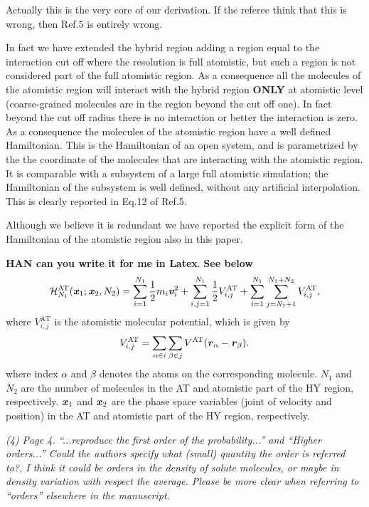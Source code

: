 \documentclass[12pt]{article}
\newcommand{\recheck}[1]{{\color{red} #1}}
\newcommand{\vect}[1]{\textbf{\textit{#1}}}
\newcommand{\AT}{{\textrm{{AT}}}}
\begin{document}
Actually this is the very core of our derivation. If the referee think
that this is wrong, then Ref.5 is entirely wrong.

In fact we have extended the hybrid region adding a region equal to
the interaction cut off where the resolution is full atomistic, but
such a region is not considered part of the full atomistic region. As
a consequence all the molecules of the atomistic region will interact
with the hybrid region {\bf ONLY} at atomistic level (coarse-grained
molecules are in the region beyond the cut off one). In fact beyond
the cut off radius there is no interaction or better the interaction
is zero. As a consequence the molecules of the atomistic region have a
well defined Hamiltonian. This is the Hamiltonian of an open system,
\recheck{and is parametrized by the the coordinate of the molecules
  that are interacting with the atomistic region}. \recheck{It is comparable with  a
subsystem of a large full atomistic simulation}; the Hamiltonian of the
subsystem is well defined, without any artificial interpolation.  This
is clearly reported in Eq.12 of Ref.5.

Although we believe it is redundant we have reported the explicit form
of the Hamiltonian of the atomistic region also in this paper.

\recheck{{\bf HAN can you write it for me in Latex}}.
\recheck{{\bf See below}}
\begin{align}
  \mathcal H^{\AT}_{N_1} (\vect x_1; \vect x_2, N_2)
  =
  \sum_{i=1}^{N_1}\frac12 m_i\vect v_i^2
  + \sum_{i,j=1}^{N_1}\frac 12 V^\AT_{i,j}
  + \sum_{i=1}^{N_1}\sum_{j=N_1+1}^{N_1+N_2} V^\AT_{i,j},
\end{align}
where $V^\AT_{i,j}$ is the atomistic molecular potential, which is given by
\begin{align}
  V^\AT_{i,j} =
  \sum_{\alpha\in i}\sum_{\beta\in j} V^\AT(\vect r_\alpha - \vect r_\beta).
\end{align}
where index $\alpha$ and $\beta$ denotes the atoms on the
corresponding molecule.  $N_1$ and $N_2$ are the number of molecules
in the AT and atomistic part of the HY region, respectively. $\vect x_1$
and $\vect x_2$ are the phase space variables (joint of velocity and position)
in the  AT and atomistic part of the HY region, respectively.

{\it (4) Page 4. ``...reproduce the first order of the
  probability...'' and ``Higher orders...'' Could the authors specify
  what (small) quantity the order is referred to?, I think it could be
  orders in the density of solute molecules, or maybe in density
  variation with respect the average. Please be more clear when
  referring to ``orders'' elsewhere in the manuscript.}
\end{document}
